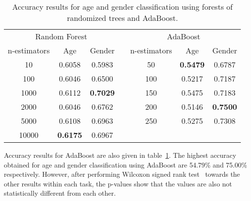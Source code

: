 \documentclass[a4paper]{llncs}
\begin{document}
\begin{table}[!htbp]
\centering
\begin{tabular}{|c|cc|l|c|cc|}
\cline{1-3} \cline{5-7}
\multicolumn{3}{|c|}{Random Forest}              &  & \multicolumn{3}{c|}{AdaBoost}                    \\ \cline{1-3} \cline{5-7} 
n-estimators & Age             & Gender          &  & n-estimators & Age             & Gender          \\ \cline{1-3} \cline{5-7} 
10           & 0.6058          & 0.5983          &  & 50           & \textbf{0.5479} & 0.6787          \\ %
100          & 0.6046          & 0.6500          &  & 100          & 0.5217          & 0.7187          \\ %
1000         & 0.6112          & \textbf{0.7029} &  & 150          & 0.5475          & 0.7183          \\ %
2000         & 0.6046          & 0.6762          &  & 200          & 0.5146          & \textbf{0.7500} \\ %
5000         & 0.6108          & 0.6963          &  & 250          & 0.5275          & 0.7308          \\ %
10000        & \textbf{0.6175} & 0.6967          &  &              &                 &                 \\ \cline{1-3} \cline{5-7} 
\end{tabular}
\caption{Accuracy results for age and gender classification using forests of randomized trees and AdaBoost.}
\label{table:RandomForestsAndAdaBoost}
\end{table}

Accuracy results for AdaBoost are also given in table~\ref{table:RandomForestsAndAdaBoost}. The highest accuracy obtained for age and gender classification using AdaBoost are 54.79\% and 75.00\% respectively. However, after performing Wilcoxon signed rank test~\cite{wilcoxon1945individual} towards the other results within each task, the p-values show that the values are also not statistically different from each other. 
\end{document}
